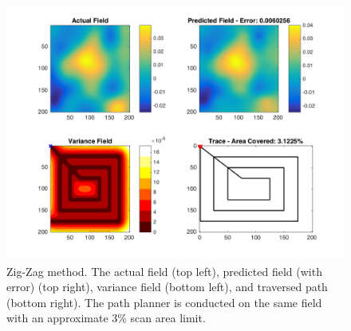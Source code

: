 \begin{figure}[htb!]
    \centering
    \includegraphics[width=0.8\linewidth]{figures/zz_200x200_3.png}
	\captionsetup{skip=0.25\baselineskip,size=footnotesize}
	\caption{Zig-Zag method. The actual field (top left), predicted field (with error) (top right), variance field (bottom left), and traversed path (bottom right). The path planner is conducted on the same field with an approximate 3\% scan area limit.}
\end{figure}
